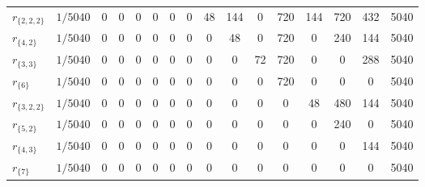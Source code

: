 \begin{table}[h]
\begin{tabular}{lccccccccccccccc}
$r_{\{2,2,2\}}$ & $1/5040$ &                      0 &                    0 &                    0 &                  0 &                  0 &                0 &                 48 &              144 &                0 &            720 &              144 &            720 &            432 &         5040 \\
  $r_{\{4,2\}}$ & $1/5040$ &                      0 &                    0 &                    0 &                  0 &                  0 &                0 &                  0 &               48 &                0 &            720 &                0 &            240 &            144 &         5040 \\
  $r_{\{3,3\}}$ & $1/5040$ &                      0 &                    0 &                    0 &                  0 &                  0 &                0 &                  0 &                0 &               72 &            720 &                0 &              0 &            288 &         5040 \\
    $r_{\{6\}}$ & $1/5040$ &                      0 &                    0 &                    0 &                  0 &                  0 &                0 &                  0 &                0 &                0 &            720 &                0 &              0 &              0 &         5040 \\
$r_{\{3,2,2\}}$ & $1/5040$ &                      0 &                    0 &                    0 &                  0 &                  0 &                0 &                  0 &                0 &                0 &              0 &               48 &            480 &            144 &         5040 \\
  $r_{\{5,2\}}$ & $1/5040$ &                      0 &                    0 &                    0 &                  0 &                  0 &                0 &                  0 &                0 &                0 &              0 &                0 &            240 &              0 &         5040 \\
  $r_{\{4,3\}}$ & $1/5040$ &                      0 &                    0 &                    0 &                  0 &                  0 &                0 &                  0 &                0 &                0 &              0 &                0 &              0 &            144 &         5040 \\
    $r_{\{7\}}$ & $1/5040$ &                      0 &                    0 &                    0 &                  0 &                  0 &                0 &                  0 &                0 &                0 &              0 &                0 &              0 &              0 &         5040 \\
\bottomrule
\end{tabular}
\end{table}

